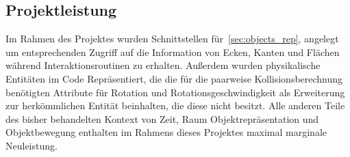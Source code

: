 \subsection{Projektleistung}
Im Rahmen des Projektes wurden Schnittstellen für~\ref{sec:objects_rep}, angelegt um entsprechenden Zugriff auf die Information von Ecken, Kanten und Flächen während Interaktionsroutinen zu erhalten. Außerdem wurden physikalische Entitäten im Code Repräsentiert, die die für die paarweise Kollisionsberechnung benötigten Attribute für Rotation und Rotationsgeschwindigkeit als Erweiterung zur herkömmlichen Entität beinhalten, die diese nicht besitzt. Alle anderen Teile des bisher behandelten Kontext von Zeit, Raum Objektrepräsentation und Objektbewegung enthalten im Rahmens dieses Projektes maximal marginale Neuleistung.


